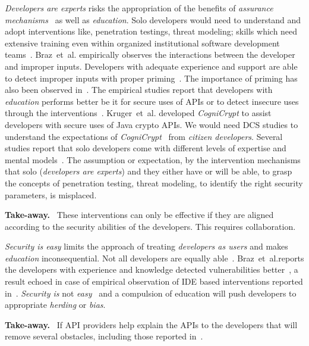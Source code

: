 \documentclass[conference]{IEEEtran}
\newenvironment{finding}{\begin{framed}\noindent\textbf{Take-away.}~}{\end{framed}}
\newcommand{\etal}[0]{et~al{.}}
\begin{document}
\emph{Developers are experts} risks the appropriation of the benefits of \emph{assurance mechanisms}~\cite{weir2020,hala2016} as well as \emph{education}. Solo developers would need to understand and adopt interventions like, penetration testings, threat modeling; skills which need extensive training even within organized institutional software development teams~\cite{weir2020}. 
Braz~\etal{} empirically observes the interactions between the developer and improper inputs. Developers with adequate experience and support are able to detect improper inputs with proper priming~\cite{braz2021}. The importance of priming has also been observed in~\cite{joseph2021,thomas2018}. The empirical studies report that developers with \emph{education} performs better be it for secure uses of APIs or to detect insecure uses through the interventions~\cite{madiha2017,naiakshina2018,zhu2014}. Kruger~\etal{} developed \emph{CogniCrypt} to assist developers with secure uses of Java crypto APIs. We would need \ac{DCS} studies to understand the expectations of \emph{CogniCrypt}~\cite{krugercognicrypt} from \emph{citizen developers}. Several studies report that solo developers come with different levels of expertise and mental models~\cite{acarusability2017,joseph2021}. The assumption or expectation, by the intervention mechanisms that solo (\emph{developers are experts}) and they either have or will be able, to grasp the concepts of penetration testing, threat modeling, to identify the right security parameters, is misplaced.  
\begin{finding}\noindent 
These interventions can only be effective if they are aligned according to the security abilities of the developers. This requires collaboration. 
\end{finding}


\emph{Security is easy} limits the approach of treating \emph{developers as users} and makes \emph{education} inconsequential. Not all developers are equally able~\cite{zhuaside2013,braz2021}. Braz~\etal reports the developers with experience and knowledge detected vulnerabilities better~\cite{braz2021}, a result echoed in case of empirical observation of IDE based interventions reported in~\cite{aside2012}. \emph{Security is} not \emph{easy}~\cite{oltrogge2018rise} and a compulsion of education will push developers to appropriate \emph{herding} or \emph{bias}. 
\begin{finding}
\noindent  
If API providers help explain the APIs to the developers that will remove several obstacles, including those reported in~\cite{nadijava2016,acar2016infosources}.  
\end{finding}
\end{document}
